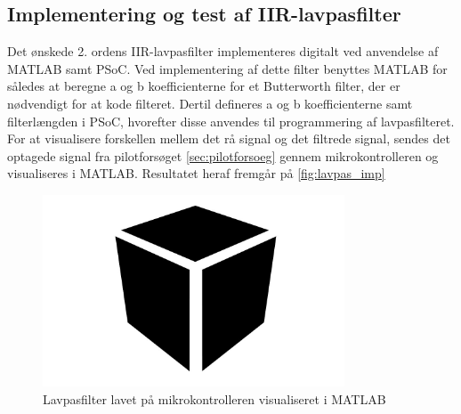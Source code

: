 \subsection{Implementering og test af IIR-lavpasfilter}
Det ønskede 2. ordens IIR-lavpasfilter implementeres digitalt ved anvendelse af MATLAB samt PSoC.
Ved implementering af dette filter benyttes MATLAB for således at beregne a og b koefficienterne for et Butterworth filter, der er nødvendigt for at kode filteret. Dertil defineres a og b koefficienterne samt filterlængden i PSoC, hvorefter disse anvendes til programmering af lavpasfilteret. 
For at visualisere forskellen mellem det rå signal og det filtrede signal, sendes det optagede signal fra pilotforsøget \autoref{sec:pilotforsoeg} gennem mikrokontrolleren og visualiseres i MATLAB. Resultatet heraf fremgår på \autoref{fig:lavpas_imp}

\begin{figure}[H]
\centering
\includegraphics[width=0.8\textwidth]{figures/Pilotforsoeg/blackbox}
\caption{Lavpasfilter lavet på mikrokontrolleren visualiseret i MATLAB}
\label{fig:lavpas_imp}
\end{figure}
 